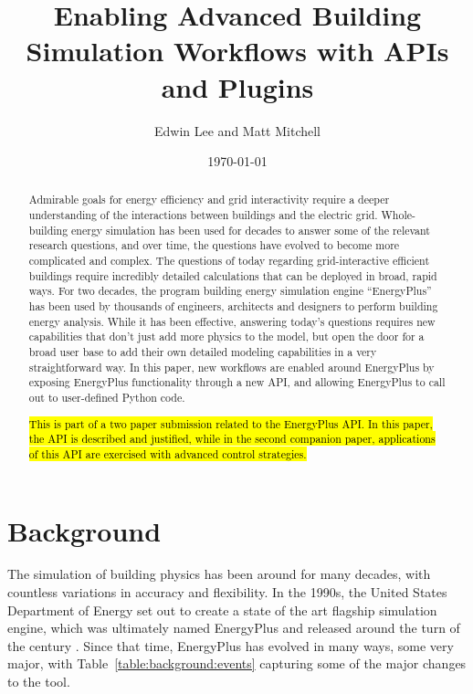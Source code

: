 \documentclass[5p]{elsarticle}
\title{Enabling Advanced Building Simulation Workflows with APIs and Plugins}
\author{Edwin Lee and Matt Mitchell}
\date{\today}
\begin{document}
  
 \begin{abstract}
Admirable goals for energy efficiency and grid interactivity require a deeper understanding of the interactions between buildings and the electric grid.  Whole-building energy simulation has been used for decades to answer some of the relevant research questions, and over time, the questions have evolved to become more complicated and complex.  The questions of today regarding grid-interactive efficient buildings require incredibly detailed calculations that can be deployed in broad, rapid ways. For two decades, the program building energy simulation engine “EnergyPlus” has been used by thousands of engineers, architects and designers to perform building energy analysis. While it has been effective, answering today’s questions requires new capabilities that don’t just add more physics to the model, but open the door for a broad user base to add their own detailed modeling capabilities in a very straightforward way.  In this paper, new workflows are enabled around EnergyPlus by exposing EnergyPlus functionality through a new API, and allowing EnergyPlus to call out to user-defined Python code.

\hl{This is part of a two paper submission related to the EnergyPlus API.  In this paper, the API is described and justified, while in the second companion paper, applications of this API are exercised with advanced control strategies.}
 \end{abstract}

 \maketitle
 
 \section{Background}

The simulation of building physics has been around for many decades, with countless variations in accuracy and flexibility.  In the 1990s, the United States Department of Energy set out to create a state of the art flagship simulation engine, which was ultimately named EnergyPlus and released around the turn of the century \cite{Crawley2001}.  Since that time, EnergyPlus has evolved in many ways, some very major, with Table~\ref{table:background:events} capturing some of the major changes to the tool.
\end{document}
